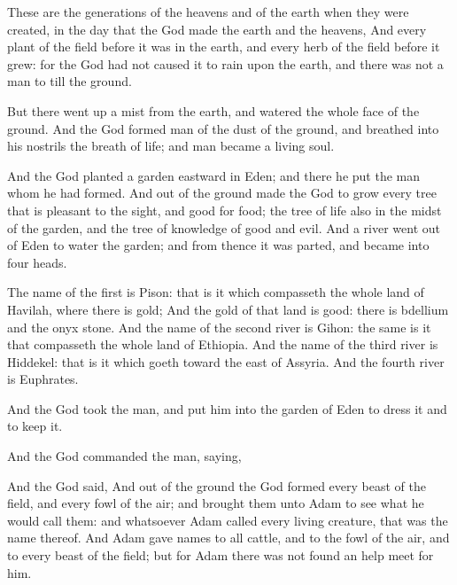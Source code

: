 \Verse These are the generations of the heavens and of the earth when they were created, in the day that the \LORD God made the earth and the heavens,
\Verse And every plant of the field before it was in the earth, and every herb of the field before it grew: for the \LORD God had not caused it to rain upon the earth, and there was not a man to till the ground.

\Verse But there went up a mist from the earth, and watered the whole face of the ground.
\Verse And the \LORD God formed man of the dust of the ground, and breathed into his nostrils the breath of life; and man became a living soul.

\Verse And the \LORD God planted a garden eastward in Eden; and there he put the man whom he had formed.
\Verse And out of the ground made the \LORD God to grow every tree that is pleasant to the sight, and good for food; the tree of life also in the midst of the garden, and the tree of knowledge of good and evil.
\Verse And a river went out of Eden to water the garden; and from thence it was parted, and became into four heads.

\Verse The name of the first is Pison: that is it which compasseth the whole land of Havilah, where there is gold; 
\Verse And the gold of that land is good: there is bdellium and the onyx stone.
\Verse And the name of the second river is Gihon: the same is it that compasseth the whole land of Ethiopia.
\Verse And the name of the third river is Hiddekel: that is it which goeth toward the east of Assyria.  And the fourth river is Euphrates.

\Verse And the \LORD God took the man, and put him into the garden of Eden to dress it and to keep it.

\Verse And the \LORD God commanded the man, saying, 

\Verse And the \LORD God said, 
\Verse And out of the ground the \LORD God formed every beast of the field, and every fowl of the air; and brought them unto Adam to see what he would call them: and whatsoever Adam called every living creature, that was the name thereof.
\Verse And Adam gave names to all cattle, and to the fowl of the air, and to every beast of the field; but for Adam there was not found an help meet for him.

